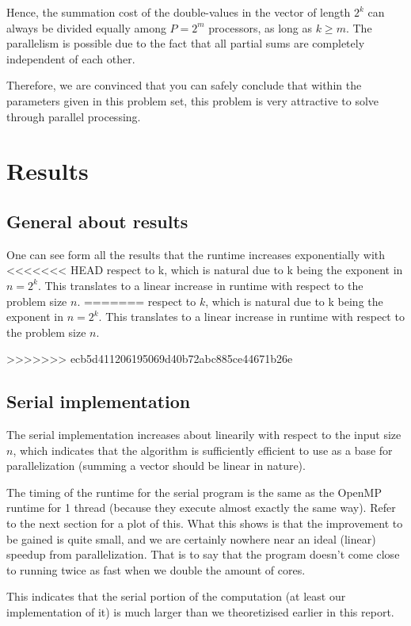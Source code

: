 \documentclass[fontsize=11pt,paper=a4,titlepage]{report}
\begin{document}
Hence, the summation cost of the double-values in the vector of length $2^k$ can
always be divided equally among $P = 2^m$ processors, as long as $k\geq m$. The
parallelism is possible due to the fact that all partial sums are completely
independent of each other.

Therefore, we are convinced that you can safely conclude that within the
parameters given in this problem set, this problem is very attractive to solve
through parallel processing.

\section{Results}

\subsection{General about results}

One can see form all the results that the runtime increases exponentially with
<<<<<<< HEAD
respect to k, which is natural due to k being the exponent in $n=2^k$. This
translates to a linear increase in runtime with respect to the problem size $n$.
=======
respect to $k$, which is natural due to k being the exponent in $n=2^k$. This
translates to a linear increase in runtime with respect to the problem size $n$.

>>>>>>> ecb5d411206195069d40b72abc885ce44671b26e

\subsection{Serial implementation}

The serial implementation increases about linearily with respect to the input
size $n$, which indicates that the algorithm is sufficiently efficient to use as a
base for parallelization (summing a vector should be linear in nature).

The timing of the runtime for the serial program is the same as the OpenMP
runtime for 1 thread (because they execute almost exactly the same way). Refer
to the next section for a plot of this. What this shows is that the improvement
to be gained is quite small, and we are certainly nowhere near an ideal (linear)
speedup from parallelization. That is to say that the program doesn't come close
to running twice as fast when we double the amount of cores.

This indicates that the serial portion of the computation (at least our
implementation of it) is much larger than we theoretizised earlier in this
report.
\end{document}
